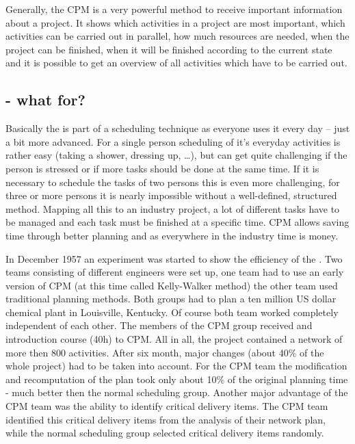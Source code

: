 Generally, the CPM is a very powerful method to receive important information
about a project. It shows which activities in a project are most important, which activities can be
carried out in parallel, how much resources are needed, when the project can be finished, when it
will be finished according to the current state and it is possible to get an overview of all
activities which have to be carried out.

\subsection{\cpm{} - what for?}

Basically the \cpm{} is part of a scheduling technique as everyone uses it every day – just a bit more
advanced. For a single person scheduling of it’s everyday activities is rather easy (taking a
shower, dressing up, \ldots), but can get quite challenging if the person is stressed or if more
tasks
should be done at the same time. If it is necessary to schedule the tasks of two persons this is
even more challenging, for three or more persons it is nearly impossible without a well-defined,
structured method. Mapping all this to an industry project, a lot of different tasks have to be
managed and each task must be finished at a specific time. CPM allows saving time through better
planning and as everywhere in the industry time is money.

In December 1957 an experiment was started to show the efficiency of the \cpm{}. Two
teams consisting of different engineers were set up, one team had to use an early version of CPM (at
this time called Kelly-Walker method) the other team used traditional planning methods. Both groups
had to plan a ten million US dollar chemical plant in Louisville, Kentucky. Of course both team worked
completely independent of each other. The members of the CPM group received and introduction course
(40h) to CPM. All in all, the project contained a network of more then 800 activities. After six
month, major changes (about 40\% of the whole project) had to be taken into account. For the CPM team
the modification and recomputation of the plan took only about 10\% of the original planning time -
much better then the normal scheduling group.  Another major advantage of the CPM team was the
ability to identify critical delivery items. The CPM team identified this critical delivery items
from the analysis of their network plan, while the normal scheduling group selected critical 
delivery items randomly\cite{obrien}. 

